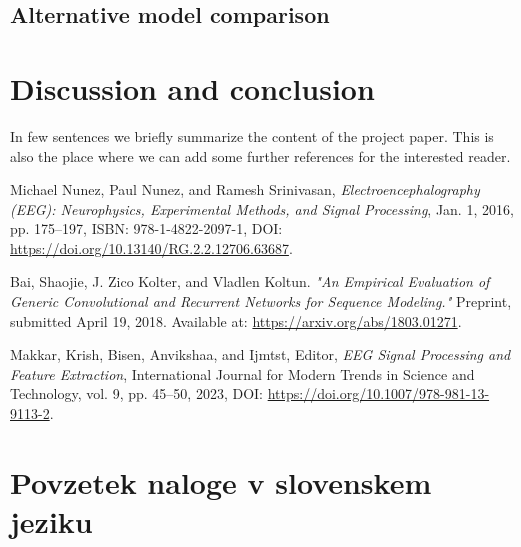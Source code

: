 \documentclass[12pt,a4paper,titlepage,openany]{report}
\begin{document}
\section{Alternative model comparison}



\chapter{Discussion and conclusion}
\thispagestyle{fancy}

In few sentences we briefly summarize the content of the project paper.
This is also the place where we can add some further references for the interested reader.


\begin{thebibliography}{99}
\thispagestyle{fancy}
     
     Michael Nunez, Paul Nunez, and Ramesh Srinivasan, 
     \emph{Electroencephalography (EEG): Neurophysics, Experimental Methods, and Signal Processing}, 
     Jan. 1, 2016, pp. 175--197, ISBN: 978-1-4822-2097-1, DOI: \url{https://doi.org/10.13140/RG.2.2.12706.63687}.

     Bai, Shaojie, J. Zico Kolter, and Vladlen Koltun. 
     \emph{"An Empirical Evaluation of Generic Convolutional and Recurrent Networks for Sequence Modeling."} 
     Preprint, submitted April 19, 2018. Available at: \url{https://arxiv.org/abs/1803.01271}.
     
     Makkar, Krish, Bisen, Anvikshaa, and Ijmtst, Editor, 
     \emph{EEG Signal Processing and Feature Extraction}, 
     International Journal for Modern Trends in Science and Technology, vol. 9, pp. 45--50, 2023, 
     DOI: \url{https://doi.org/10.1007/978-981-13-9113-2}.   
    
     
\end{thebibliography}
\newpage


\chapter{Povzetek naloge v slovenskem jeziku}
\thispagestyle{fancy}
\end{document}

